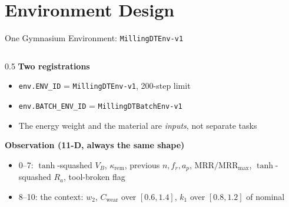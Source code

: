 ﻿\documentclass[11pt,aspectratio=169]{beamer}
\newcommand{\MRR}{\mathrm{MRR}}
\newcommand{\Ra}{R_a}
\newcommand{\VB}{V_B}
\begin{document}
\section{Environment Design}

\begin{frame}{One Gymnasium Environment: \texttt{MillingDTEnv-v1}}
    \footnotesize
    \begin{columns}[T]
        \begin{column}{0.5\textwidth}
            \textbf{Two registrations}
            \begin{itemize}
                \item \texttt{env.ENV\_ID} = \texttt{MillingDTEnv-v1}, 200-step limit
                \item \texttt{env.BATCH\_ENV\_ID} = \texttt{MillingDTBatchEnv-v1}
                \item The energy weight and the material are \emph{inputs}, not separate tasks
            \end{itemize}

            \textbf{Observation (11-D, always the same shape)}
            \begin{itemize}
                \item 0--7: $\tanh$-squashed $\VB$, $\kappa_{\text{rem}}$, previous $n, f_r, a_p$,
                      $\MRR/\MRR_{\text{max}}$, $\tanh$-squashed $\Ra$, tool-broken flag
                \item 8--10: the context: $w_2$, $C_\text{wear}$ over $[0.6,1.4]$,
                      $k_1$ over $[0.8,1.2]$ of nominal
            \end{itemize}


\end{column}
\end{columns}
\end{frame}
\end{document}
